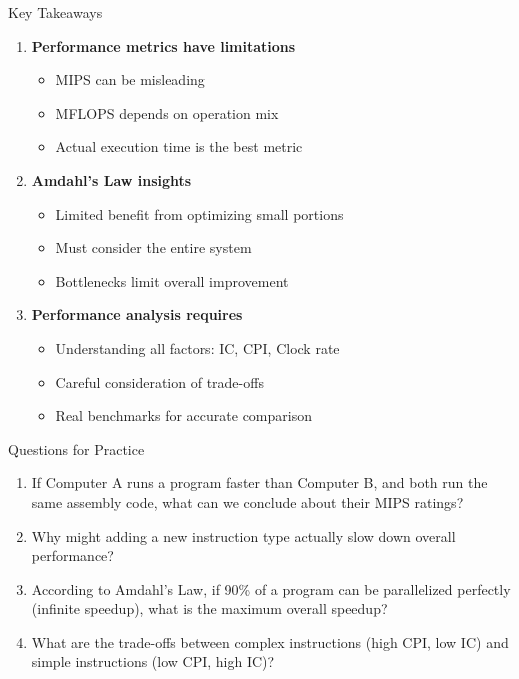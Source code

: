 \documentclass[aspectratio=169,12pt]{beamer}
\begin{document}
\begin{frame}{Key Takeaways}
\begin{enumerate}
    \item \textbf{Performance metrics have limitations}
    \begin{itemize}
        \item MIPS can be misleading
        \item MFLOPS depends on operation mix
        \item Actual execution time is the best metric
    \end{itemize}
    
    \item \textbf{Amdahl's Law insights}
    \begin{itemize}
        \item Limited benefit from optimizing small portions
        \item Must consider the entire system
        \item Bottlenecks limit overall improvement
    \end{itemize}
    
    \item \textbf{Performance analysis requires}
    \begin{itemize}
        \item Understanding all factors: IC, CPI, Clock rate
        \item Careful consideration of trade-offs
        \item Real benchmarks for accurate comparison
    \end{itemize}
\end{enumerate}
\end{frame}

\begin{frame}{Questions for Practice}
\begin{enumerate}
    \item If Computer A runs a program faster than Computer B, and both run the same assembly code, what can we conclude about their MIPS ratings?
    
    \item Why might adding a new instruction type actually slow down overall performance?
    
    \item According to Amdahl's Law, if 90\% of a program can be parallelized perfectly (infinite speedup), what is the maximum overall speedup?
    
    \item What are the trade-offs between complex instructions (high CPI, low IC) and simple instructions (low CPI, high IC)?
\end{enumerate}
\end{frame}
\end{document}
